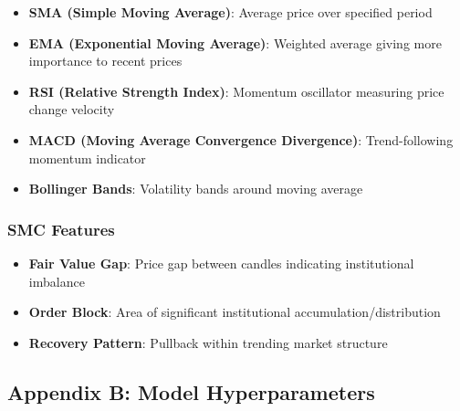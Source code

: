 \begin{itemize}
\tightlist
\item
  \textbf{SMA (Simple Moving Average)}: Average price over specified
  period
\item
  \textbf{EMA (Exponential Moving Average)}: Weighted average giving
  more importance to recent prices
\item
  \textbf{RSI (Relative Strength Index)}: Momentum oscillator measuring
  price change velocity
\item
  \textbf{MACD (Moving Average Convergence Divergence)}: Trend-following
  momentum indicator
\item
  \textbf{Bollinger Bands}: Volatility bands around moving average
\end{itemize}

\subsubsection{SMC Features}\label{smc-features}

\begin{itemize}
\tightlist
\item
  \textbf{Fair Value Gap}: Price gap between candles indicating
  institutional imbalance
\item
  \textbf{Order Block}: Area of significant institutional
  accumulation/distribution
\item
  \textbf{Recovery Pattern}: Pullback within trending market structure
\end{itemize}

\subsection{Appendix B: Model
Hyperparameters}\label{appendix-b-model-hyperparameters}

